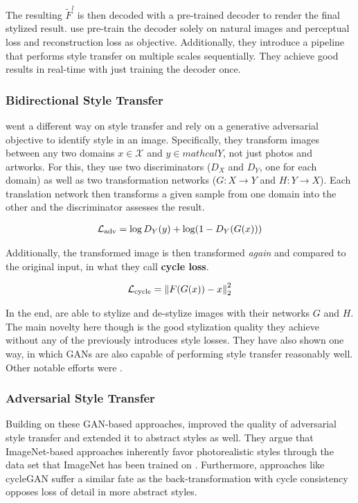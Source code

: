 The resulting $\tilde{F}^l$ is then decoded with a pre-trained decoder to render the final stylized result.
\citeauthor*{WCT} use pre-train the decoder solely on natural images and perceptual loss and reconstruction loss as objective.
Additionally, they introduce a pipeline that performs style transfer on multiple scales sequentially.
They achieve good results in real-time with just training the decoder once.

\subsubsection{Bidirectional Style Transfer}
\citeauthor*{CycleGAN} went a different way on style transfer and rely on a generative adversarial objective to identify style in an image.
Specifically, they transform images between any two domains $x \in \mathcal{X}$ and $y \in mathcal{Y}$, not just photos and artworks.
For this, they use two discriminators ($D_X$ and $D_Y$, one for each domain) as well as two transformation networks ($G: X \rightarrow Y$ and $H: Y \rightarrow X$).
Each translation network then transforms a given sample from one domain into the other and the discriminator assesses the result.

\begin{align}
    \mathcal{L}_{\text{adv}} = \log D_Y(y) + \log(1 - D_Y(G(x)))
\end{align}

Additionally, the transformed image is then transformed \textit{again} and compared to the original input, in what they call \textbf{cycle loss}.

\begin{align}
    \mathcal{L}_{\text{cycle}} = \left\lVert F(G(x)) - x\right\rVert^2_2
\end{align}

In the end, \citeauthor*{CycleGAN} are able to stylize and de-stylize images with their networks $G$ and $H$.
The main novelty here though is the good stylization quality they achieve without any of the previously introduces style losses.
They have also shown one way, in which GANs are also capable of performing style transfer reasonably well.
Other notable efforts were .

\subsubsection{Adversarial Style Transfer}
Building on these GAN-based approaches, \citeauthor*{artsiom} improved the quality of adversarial style transfer and extended it to abstract styles as well.
They argue that ImageNet-based approaches inherently favor photorealistic styles through the data set that ImageNet has been trained on \cite{artsiom}.
Furthermore, approaches like cycleGAN suffer a similar fate as the back-transformation with cycle consistency opposes loss of detail in more abstract styles.

